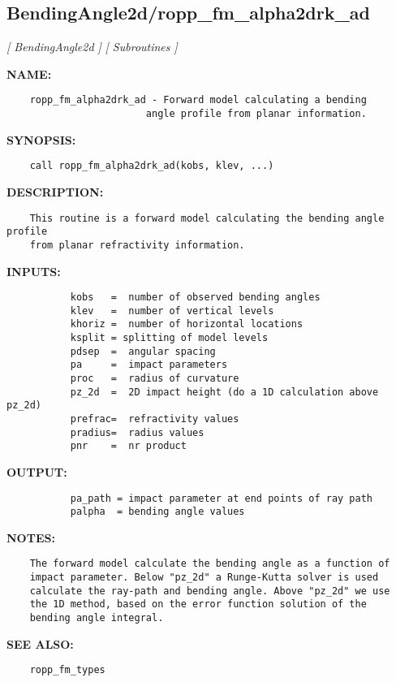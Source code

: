 \subsection{BendingAngle2d/ropp\_fm\_alpha2drk\_ad}
\textsl{[ BendingAngle2d ]}
\textsl{[ Subroutines ]}

\label{ch:robo8}
\label{ch:BendingAngle2d_ropp_fm_alpha2drk_ad}
\textbf{NAME:}\hspace{0.08in}\begin{Verbatim}
    ropp_fm_alpha2drk_ad - Forward model calculating a bending
                        angle profile from planar information.
\end{Verbatim}
\textbf{SYNOPSIS:}\hspace{0.08in}\begin{Verbatim}
    call ropp_fm_alpha2drk_ad(kobs, klev, ...)
\end{Verbatim}
\textbf{DESCRIPTION:}\hspace{0.08in}\begin{Verbatim}
    This routine is a forward model calculating the bending angle profile
    from planar refractivity information.  
\end{Verbatim}
\textbf{INPUTS:}\hspace{0.08in}\begin{Verbatim}
           kobs   =  number of observed bending angles 
           klev   =  number of vertical levels
           khoriz =  number of horizontal locations
           ksplit = splitting of model levels
           pdsep  =  angular spacing
           pa     =  impact parameters
           proc   =  radius of curvature 
           pz_2d  =  2D impact height (do a 1D calculation above pz_2d)
           prefrac=  refractivity values
           pradius=  radius values
           pnr    =  nr product 
\end{Verbatim}
\textbf{OUTPUT:}\hspace{0.08in}\begin{Verbatim}
           pa_path = impact parameter at end points of ray path
           palpha  = bending angle values 
\end{Verbatim}
\textbf{NOTES:}\hspace{0.08in}\begin{Verbatim}
    The forward model calculate the bending angle as a function of
    impact parameter. Below "pz_2d" a Runge-Kutta solver is used
    calculate the ray-path and bending angle. Above "pz_2d" we use
    the 1D method, based on the error function solution of the 
    bending angle integral.  
\end{Verbatim}
\textbf{SEE ALSO:}\hspace{0.08in}\begin{Verbatim}
    ropp_fm_types
\end{Verbatim}

